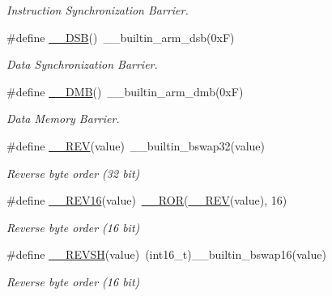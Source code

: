 \begin{DoxyCompactItemize}
\begin{DoxyCompactList}\small\item\em Instruction Synchronization Barrier. \end{DoxyCompactList}\item 
\#define \mbox{\hyperlink{group___c_m_s_i_s___core___instruction_interface_ga067d257a2b34565410acefb5afef2203}{\+\_\+\+\_\+\+D\+SB}}()~\+\_\+\+\_\+builtin\+\_\+arm\+\_\+dsb(0x\+F)
\begin{DoxyCompactList}\small\item\em Data Synchronization Barrier. \end{DoxyCompactList}\item 
\#define \mbox{\hyperlink{group___c_m_s_i_s___core___instruction_interface_ga671101179b5943990785f36f8c1e2269}{\+\_\+\+\_\+\+D\+MB}}()~\+\_\+\+\_\+builtin\+\_\+arm\+\_\+dmb(0x\+F)
\begin{DoxyCompactList}\small\item\em Data Memory Barrier. \end{DoxyCompactList}\item 
\#define \mbox{\hyperlink{group___c_m_s_i_s___core___instruction_interface_gaca25a02e09983da5558f5242f2f635bc}{\+\_\+\+\_\+\+R\+EV}}(value)~\+\_\+\+\_\+builtin\+\_\+bswap32(value)
\begin{DoxyCompactList}\small\item\em Reverse byte order (32 bit) \end{DoxyCompactList}\item 
\#define \mbox{\hyperlink{group___c_m_s_i_s___core___instruction_interface_gad35497777af37e7809271b5e6f9510ba}{\+\_\+\+\_\+\+R\+E\+V16}}(value)~\mbox{\hyperlink{group___c_m_s_i_s___core___instruction_interface_gab16acb6456176f1e87a4f2724c2b6028}{\+\_\+\+\_\+\+R\+OR}}(\mbox{\hyperlink{group___c_m_s_i_s___core___instruction_interface_gadb92679719950635fba8b1b954072695}{\+\_\+\+\_\+\+R\+EV}}(value), 16)
\begin{DoxyCompactList}\small\item\em Reverse byte order (16 bit) \end{DoxyCompactList}\item 
\#define \mbox{\hyperlink{group___c_m_s_i_s___core___instruction_interface_gae580812686119c9c5cf3c11a7519a404}{\+\_\+\+\_\+\+R\+E\+V\+SH}}(value)~(int16\+\_\+t)\+\_\+\+\_\+builtin\+\_\+bswap16(value)
\begin{DoxyCompactList}\small\item\em Reverse byte order (16 bit) \end{DoxyCompactList}\item 

\end{DoxyCompactItemize}
